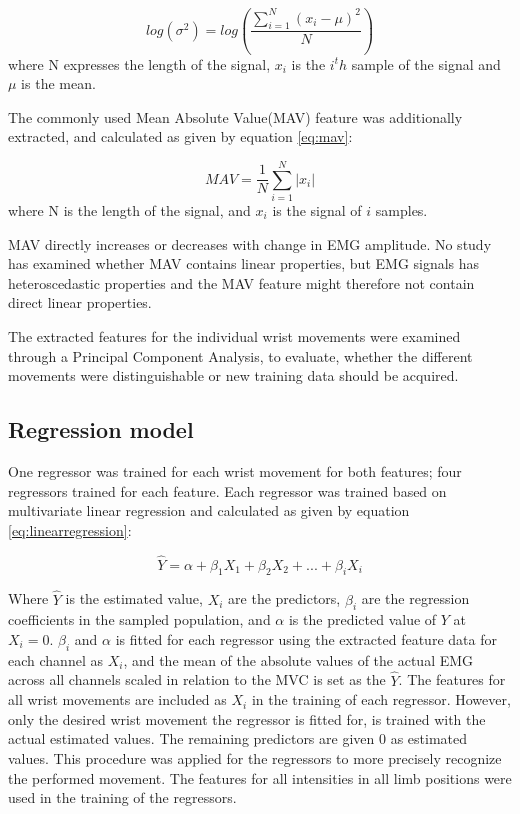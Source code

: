 \begin{equation} \label{eq:logvar}
log(\sigma^2) = log(\frac{\sum\limits_{i=1}^N(x_i - \mu)^2}{N})
\end{equation}
where N expresses the length of the signal, $x_i$ is the $i^th$ sample of the signal and $\mu$ is the mean. 

The commonly used Mean Absolute Value(MAV) feature was additionally extracted, and calculated as given by equation \ref{eq:mav}:

\begin{equation} \label{eq:mav}
MAV = \frac{1}{N}\sum\limits_{i=1}^N|x_i|
\end{equation}
where N is the length of the signal, and $x_i$ is the signal of $i$ samples.

MAV directly increases or decreases with change in EMG amplitude. No study has examined whether MAV contains linear properties, but EMG signals has heteroscedastic properties \cite{rasool2012} and the MAV feature might therefore not contain direct linear properties.

The extracted features for the individual wrist movements were examined through a Principal Component Analysis, to evaluate, whether the different movements were distinguishable or new training data should be acquired.

\subsection{Regression model}
One regressor was trained for each wrist movement for both features; four regressors trained for each feature. Each regressor was trained based on multivariate linear regression and calculated as given by equation \ref{eq:linearregression}:

\begin{equation} \label{eq:linearregression}
\hat{Y} = \alpha + \beta_1 X_{1} + \beta_2 X_{2} + ... + \beta_i X_{i}
\end{equation}

Where $\hat{Y}$ is the estimated value, $X_i$ are the predictors, $\beta_i$ are the regression coefficients in the sampled population, and $\alpha$ is the predicted value of $Y$ at $X_{i} = 0$. $\beta_i$ and $\alpha$ is fitted for each regressor using the extracted feature data for each channel as $X_i$, and the mean of the absolute values of the actual EMG across all channels scaled in relation to the MVC is set as the $\hat{Y}$. The features for all wrist movements are included as $X_i$ in the training of each regressor. However, only the desired wrist movement the regressor is fitted for, is trained with the actual estimated values. The remaining predictors are given 0 as estimated values. This procedure was applied for the regressors to more precisely recognize the performed movement. The features for all intensities in all limb positions were used in the training of the regressors.

